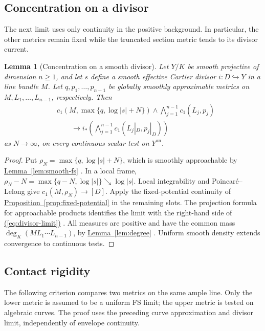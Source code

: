 \documentclass[11pt]{amsart}
\newtheorem{lemma}[theorem]{Lemma}
\theoremstyle{definition}
\theoremstyle{remark}
\numberwithin{equation}{section}
\newcommand{\an}{\mathrm{an}}
\newcommand{\namedref}[2]{%
 \begingroup
 \ifstrequal{#1}{Section}{\hypersetup{linkcolor=sectionteal}}{%
  \ifstrequal{#1}{Appendix}{\hypersetup{linkcolor=sectionteal}}{}}%
 \hyperref[#2]{#1~\ref*{#2}}%
 \endgroup}
\renewcommand{\eqref}[1]{%
 \begingroup\hypersetup{linkcolor=equationviolet}%
 \hyperref[#1]{\textup{(\ref*{#1})}}%
 \endgroup}
\begin{document}
\subsection{Concentration on a divisor}\label{subsec:divisor-limit}
The next limit uses only continuity in the positive background. In
particular, the other metrics remain fixed while the truncated
section metric tends to its divisor current.

\begin{lemma}[Concentration on a smooth divisor]\label{lem:divisor-limit}
Let \(Y/K\) be smooth projective of dimension \(n\geq1\), and let
\(s\) define a smooth effective Cartier divisor
\(i:D\hookrightarrow Y\) in a line bundle \(M\).
Let \(q,p_1,\ldots,p_{n-1}\) be globally smoothly approximable
metrics on \(M,L_1,\ldots,L_{n-1}\), respectively. Then
\begin{equation}\label{eq:divisor-limit}
 \begin{split}
 &c_1\!\left(M,\max\{q,\log|s|+N\}\right)
   \wedge\bigwedge_{j=1}^{n-1}c_1(L_j,p_j)\\
 &\hspace{2em}\longrightarrow
 i_*\!\left(\bigwedge_{j=1}^{n-1}
              c_1(L_j|_D,p_j|_D)\right)
 \end{split}
\end{equation}
as \(N\to\infty\), on every continuous scalar test on \(Y^\an\).
\end{lemma}

\begin{proof}
Put \(\rho_N=\max\{q,\log|s|+N\}\), which is smoothly approachable by
\namedref{Lemma}{lem:smooth-fs}. In a local frame,
\(\rho_N-N=\max\{q-N,\log|s|\}\searrow\log|s|\).
Local integrability and Poincar\'e--Lelong give
\(c_1(M,\rho_N)\to[D]\). Apply the fixed-potential continuity of
\namedref{Proposition}{prop:fixed-potential} in the remaining slots.
The projection formula for approachable products
\cite[Proposition 8.7.5]{CLD25} identifies the limit with the
right-hand side of \eqref{eq:divisor-limit}.
All measures are positive and have the common mass
\(\deg_K(ML_1\cdots L_{n-1})\), by \namedref{Lemma}{lem:degree}.
Uniform smooth density extends convergence to continuous tests.
\end{proof}

\subsection{Contact rigidity}\label{subsec:contact-proof}
The following criterion compares two metrics on the same ample line.
Only the lower metric is assumed to be a uniform FS limit; the upper
metric is tested on algebraic curves. The proof uses the preceding
curve approximation and divisor limit, independently of envelope continuity.
\end{document}
